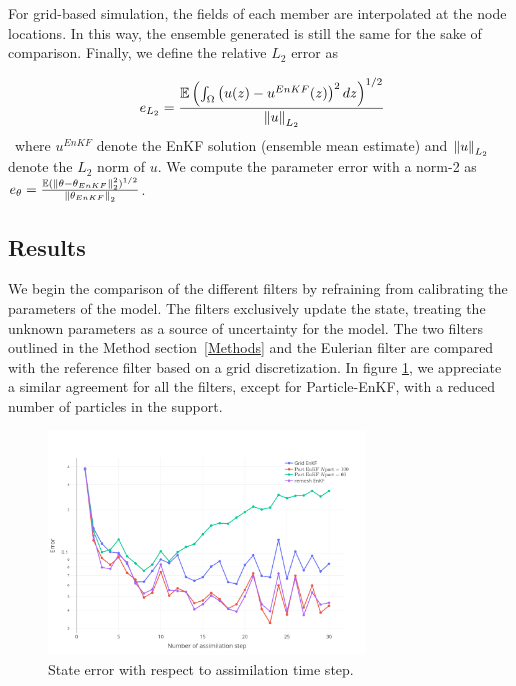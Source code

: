 For grid-based simulation, the fields of each member are interpolated at the node locations. In this way, the ensemble generated is still the same for the sake of comparison.
Finally, we define the relative $L_2$ error as

\begin{equation}~\label{eq:L2_error}
	e_{L_2} =\frac{\mathbb E \left(\int_\Omega \left(u(z) - u^{EnKF}(z)\right)^2 dz\right)^{1/2}}{\left\lVert u \right\rVert_{L_2}}
\end{equation}~where $u^{EnKF}$ denote the EnKF solution (ensemble mean estimate) and $\left\lVert u \right\rVert_{L_2}$ denote the $L_2$ norm of $u$. We compute the parameter error with a norm-2 as $e_{\theta} = \frac{\mathbb E (\left\lVert \theta - \theta_{EnKF} \right\rVert_2^2)^{1/2}}{\left\lVert \theta_{EnKF} \right\rVert_2}$.

\subsection{Results}

We begin the comparison of the different filters by refraining from calibrating the parameters of the model. The filters exclusively update the state, treating the unknown parameters as a source of uncertainty for the model. The two filters outlined in the Method section~\ref{Methods} and the Eulerian filter are compared with the reference filter based on a grid discretization.
In figure \ref{fig:1d_error_time}, we appreciate a similar agreement for all the filters, except for Particle-EnKF, with a reduced number of particles in the support.

\begin{figure}
	\centering
	\includegraphics[width=0.75\textwidth]{images/app1d/wo_calibration/state_error.png}
	\caption{State error with respect to assimilation time step.}
	\label{fig:1d_error_time}
\end{figure}

